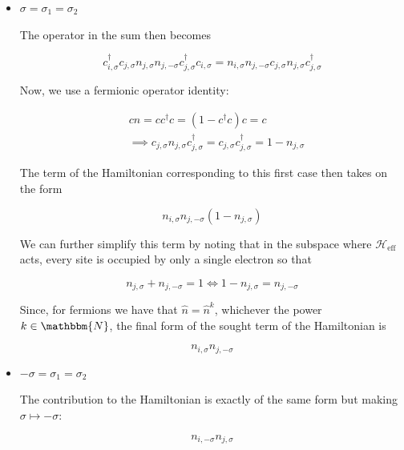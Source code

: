 \begin{itemize}

\item $\sigma = \sigma_1 = \sigma_2$

The operator in the sum then becomes

\begin{equation*}
c_{i,\sigma}^\dagger c_{j,\sigma} n_{j,\sigma} n_{j, -\sigma} c_{j, \sigma}^\dagger c_{i, \sigma} = n_{i,\sigma} n_{j, -\sigma} c_{j,\sigma} n_{j, \sigma} c_{j, \sigma}^\dagger
\end{equation*}

Now, we use a fermionic operator identity:

\begin{equation*}
\begin{split}
&c n = c c^\dagger c = ( 1 -  c^\dagger c ) c = c \\
&\implies c_{j,\sigma} n_{j,\sigma} c_{j,\sigma}^\dagger = c_{j,\sigma} c_{j,\sigma}^\dagger = 1 - n_{j,\sigma}
\end{split}
\end{equation*}

The term of the Hamiltonian corresponding to this first case then takes on the form

\begin{equation*}
n_{i,\sigma} n_{j,-\sigma} ( 1 - n_{j, \sigma} )
\end{equation*}

We can further simplify this term by noting that in the subspace where $\mathcal{H}_{\text{eff}}$ acts, every site is occupied by only a single electron so that

\begin{equation*}
n_{j,\sigma} + n_{j,-\sigma} = 1 \iff 1 - n_{j,\sigma} = n_{j,-\sigma}
\end{equation*}

Since, for fermions we have that $\hat{n} = \hat{n}^k$, whichever the power $k \in \mathbbm{N}$, the final form of the sought term of the Hamiltonian is

\begin{equation*}
n_{i,\sigma} n_{j, -\sigma}
\end{equation*}

\item $-\sigma = \sigma_1 = \sigma_2$

The contribution to the Hamiltonian is exactly of the same form but making $\sigma \mapsto -\sigma$:

\begin{equation*}
n_{i,-\sigma} n_{j, \sigma}
\end{equation*}


\end{itemize}
